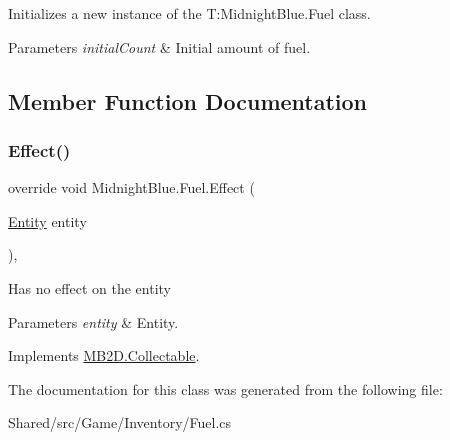 Initializes a new instance of the T\+:\+Midnight\+Blue.\+Fuel class. 


\begin{DoxyParams}{Parameters}
{\em initial\+Count} & Initial amount of fuel.\\
\hline
\end{DoxyParams}


\subsection{Member Function Documentation}
\hypertarget{class_midnight_blue_1_1_fuel_a9ab52c79211ec8cdcc9389f772615ac0}{}\label{class_midnight_blue_1_1_fuel_a9ab52c79211ec8cdcc9389f772615ac0} 
\subsubsection{\texorpdfstring{Effect()}{Effect()}}
{\footnotesize\ttfamily override void Midnight\+Blue.\+Fuel.\+Effect (\begin{DoxyParamCaption}\item[{\hyperlink{class_m_b2_d_1_1_entity_component_1_1_entity}{Entity}}]{entity }\end{DoxyParamCaption})\hspace{0.3cm}{\ttfamily [inline]}, {\ttfamily [virtual]}}



Has no effect on the entity 


\begin{DoxyParams}{Parameters}
{\em entity} & Entity.\\
\hline
\end{DoxyParams}


Implements \hyperlink{class_m_b2_d_1_1_collectable_aeb2c8847eb3d5937b015f298703fd753}{M\+B2\+D.\+Collectable}.



The documentation for this class was generated from the following file\+:\begin{DoxyCompactItemize}
\item 
Shared/src/\+Game/\+Inventory/Fuel.\+cs\end{DoxyCompactItemize}
